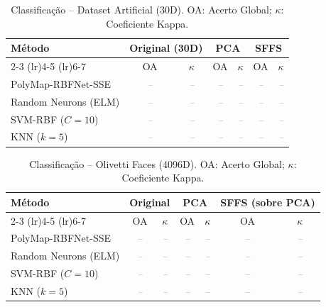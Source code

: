 \documentclass[12pt, a4paper]{article}
\newcommand{\placeholder}[1]{\textcolor{gray}{\textit{#1}}}
\begin{document}
\begin{table}[H]
    \centering
    \caption{Classificação -- Dataset Artificial (30D). OA: Acerto Global; $\kappa$: Coeficiente Kappa.}
    \label{tab:class_artificial}
    \setlength{\tabcolsep}{5pt}
    \begin{tabular}{lcccccc}
        \toprule
        \multirow{2}{*}{\textbf{Método}} &
        \multicolumn{2}{c}{\textbf{Original (30D)}} &
        \multicolumn{2}{c}{\textbf{PCA}} &
        \multicolumn{2}{c}{\textbf{SFFS}} \\
        \cmidrule(lr){2-3} \cmidrule(lr){4-5} \cmidrule(lr){6-7}
        & OA & $\kappa$ & OA & $\kappa$ & OA & $\kappa$ \\
        \midrule
        PolyMap-RBFNet-SSE & \placeholder{--} & \placeholder{--} & \placeholder{--} & \placeholder{--} & \placeholder{--} & \placeholder{--} \\
        Random Neurons (ELM) & \placeholder{--} & \placeholder{--} & \placeholder{--} & \placeholder{--} & \placeholder{--} & \placeholder{--} \\
        SVM-RBF ($C=10$)  & \placeholder{--} & \placeholder{--} & \placeholder{--} & \placeholder{--} & \placeholder{--} & \placeholder{--} \\
        KNN ($k=5$)        & \placeholder{--} & \placeholder{--} & \placeholder{--} & \placeholder{--} & \placeholder{--} & \placeholder{--} \\
        \bottomrule
    \end{tabular}
\end{table}

\begin{table}[H]
    \centering
    \caption{Classificação -- Olivetti Faces (4096D). OA: Acerto Global; $\kappa$: Coeficiente Kappa.}
    \label{tab:class_olivetti}
    \setlength{\tabcolsep}{5pt}
    \begin{tabular}{lcccccc}
        \toprule
        \multirow{2}{*}{\textbf{Método}} &
        \multicolumn{2}{c}{\textbf{Original}} &
        \multicolumn{2}{c}{\textbf{PCA}} &
        \multicolumn{2}{c}{\textbf{SFFS (sobre PCA)}} \\
        \cmidrule(lr){2-3} \cmidrule(lr){4-5} \cmidrule(lr){6-7}
        & OA & $\kappa$ & OA & $\kappa$ & OA & $\kappa$ \\
        \midrule
        PolyMap-RBFNet-SSE & \placeholder{--} & \placeholder{--} & \placeholder{--} & \placeholder{--} & \placeholder{--} & \placeholder{--} \\
        Random Neurons (ELM) & \placeholder{--} & \placeholder{--} & \placeholder{--} & \placeholder{--} & \placeholder{--} & \placeholder{--} \\
        SVM-RBF ($C=10$)  & \placeholder{--} & \placeholder{--} & \placeholder{--} & \placeholder{--} & \placeholder{--} & \placeholder{--} \\
        KNN ($k=5$)        & \placeholder{--} & \placeholder{--} & \placeholder{--} & \placeholder{--} & \placeholder{--} & \placeholder{--} \\
        \bottomrule
    \end{tabular}
\end{table}
\end{document}
